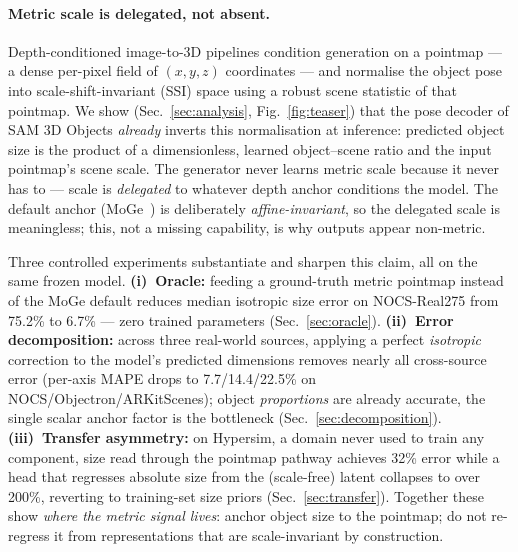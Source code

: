 \documentclass[runningheads]{llncs}
\begin{document}
\paragraph{Metric scale is delegated, not absent.}
Depth-conditioned image-to-3D pipelines condition generation on a pointmap --- a dense
per-pixel field of $(x,y,z)$ coordinates --- and normalise the object pose into
scale-shift-invariant (SSI) space using a robust scene statistic of that pointmap.
We show (Sec.~\ref{sec:analysis}, Fig.~\ref{fig:teaser}) that the pose decoder of SAM 3D
Objects \emph{already} inverts this normalisation at inference: predicted object size is
the product of a dimensionless, learned object--scene ratio and the input pointmap's
scene scale. The generator never learns metric scale because it never has to --- scale is
\emph{delegated} to whatever depth anchor conditions the model. The default anchor
(MoGe~\cite{moge}) is deliberately \emph{affine-invariant}, so the delegated scale is
meaningless; this, not a missing capability, is why outputs appear non-metric.

Three controlled experiments substantiate and sharpen this claim, all on the same frozen
model. \textbf{(i)~Oracle:} feeding a ground-truth metric pointmap instead of the MoGe
default reduces median isotropic size error on NOCS-Real275 from 75.2\% to 6.7\% ---
zero trained parameters (Sec.~\ref{sec:oracle}). \textbf{(ii)~Error decomposition:}
across three real-world sources, applying a perfect \emph{isotropic} correction to the
model's predicted dimensions removes nearly all cross-source error (per-axis MAPE
drops to 7.7/14.4/22.5\% on NOCS/Objectron/ARKitScenes); object \emph{proportions} are
already accurate, the single scalar anchor factor is the bottleneck
(Sec.~\ref{sec:decomposition}). \textbf{(iii)~Transfer asymmetry:} on Hypersim, a domain
never used to train any component, size read through the pointmap pathway achieves
32\% error while a head that regresses absolute size from the (scale-free) latent
collapses to over 200\%, reverting to training-set size priors
(Sec.~\ref{sec:transfer}). Together these show \emph{where the metric signal lives}:
anchor object size to the pointmap; do not re-regress it from representations that are
scale-invariant by construction.
\end{document}
